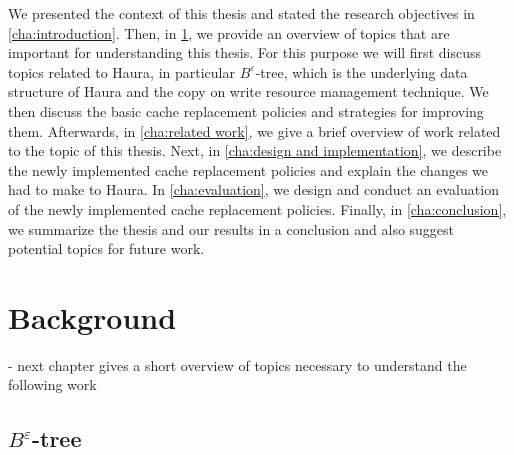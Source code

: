 \documentclass[
	12pt,
	a4paper,
	abstract,
	bibliography=totoc,
	chapterprefix,
	headings=openright,
	numbers=endperiod,
	parskip=half,
	twoside,
]{scrreprt}
\begin{document}
We presented the context of this thesis and stated the research objectives in \cref{cha:introduction}.
Then, in \cref{cha:background}, we provide an overview of topics that are important for understanding this thesis.
For this purpose we will first discuss topics related to Haura, in particular $B^{\varepsilon}$-tree,
which is the underlying data structure of Haura and the copy on write resource management technique.
We then discuss the basic cache replacement policies and strategies for improving them.
Afterwards, in \cref{cha:related work}, we give a brief overview of work related to the topic of this thesis.
Next, in \cref{cha:design and implementation}, we describe the newly implemented cache replacement policies 
and explain the changes we had to make to Haura.
In \cref{cha:evaluation}, we design and conduct an evaluation of the newly implemented cache replacement policies.
Finally, in \cref{cha:conclusion}, we summarize the thesis and our results in a conclusion and
 also suggest potential topics for future work.


\chapter{Background}
\label{cha:background}


- next chapter gives a short overview of topics necessary to understand the following work\\

\section{$B^{\varepsilon}$-tree}
\label{sec:tree}

\end{document}
